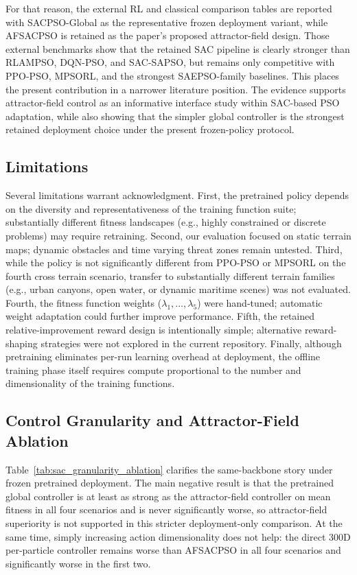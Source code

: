 \documentclass[final,5p,times]{elsarticle}
\begin{document}
For that reason, the external RL and classical comparison tables are reported with SACPSO-Global as the representative frozen deployment variant, while AFSACPSO is retained as the paper's proposed attractor-field design.
Those external benchmarks show that the retained SAC pipeline is clearly stronger than RLAMPSO, DQN-PSO, and SAC-SAPSO, but remains only competitive with PPO-PSO, MPSORL, and the strongest SAEPSO-family baselines.
This places the present contribution in a narrower literature position.
The evidence supports attractor-field control as an informative interface study within SAC-based PSO adaptation, while also showing that the simpler global controller is the strongest retained deployment choice under the present frozen-policy protocol.
\subsection{Limitations}
Several limitations warrant acknowledgment.
First, the pretrained policy depends on the diversity and representativeness of the training function suite; substantially different fitness landscapes (e.g., highly constrained or discrete problems) may require retraining.
Second, our evaluation focused on static terrain maps; dynamic obstacles and time varying threat zones remain untested.
Third, while the policy is not significantly different from PPO-PSO or MPSORL on the fourth cross terrain scenario, transfer to substantially different terrain families (e.g., urban canyons, open water, or dynamic maritime scenes) was not evaluated.
Fourth, the fitness function weights ($\lambda_1, \ldots, \lambda_5$) were hand-tuned; automatic weight adaptation could further improve performance.
Fifth, the retained relative-improvement reward design is intentionally simple; alternative reward-shaping strategies were not explored in the current repository.
Finally, although pretraining eliminates per-run learning overhead at deployment, the offline training phase itself requires compute proportional to the number and dimensionality of the training functions.
\subsection{Control Granularity and Attractor-Field Ablation}
Table~\ref{tab:sac_granularity_ablation} clarifies the same-backbone story under frozen pretrained deployment.
The main negative result is that the pretrained global controller is at least as strong as the attractor-field controller on mean fitness in all four scenarios and is never significantly worse, so attractor-field superiority is not supported in this stricter deployment-only comparison.
At the same time, simply increasing action dimensionality does not help: the direct 300D per-particle controller remains worse than AFSACPSO in all four scenarios and significantly worse in the first two.
\end{document}
